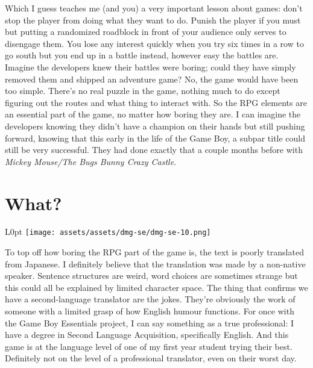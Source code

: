 \documentclass{book}
\let\oldcenter\center
\let\oldendcenter\endcenter
\renewenvironment{center}{\setlength\topsep{0pt}\oldcenter}{\oldendcenter}
\begin{document}
\begin{center}
\vspace{8pt}
\quad\vspace{4pt}
\end{center}

Which I guess teaches me (and you) a very important lesson about games: don’t stop the player from doing what they want to do. Punish the player if you must but putting a randomized roadblock in front of your audience only serves to disengage them. You lose any interest quickly when you try six times in a row to go south but you end up in a battle instead, however easy the battles are. Imagine the developers knew their battles were boring; could they have simply removed them and shipped an adventure game? No, the game would have been too simple. There’s no real puzzle in the game, nothing much to do except figuring out the routes and what thing to interact with. So the RPG elements are an essential part of the game, no matter how boring they are. I can imagine the developers knowing they didn’t have a champion on their hands but still pushing forward, knowing that this early in the life of the Game Boy, a subpar title could still be very successful. They had done exactly that a couple months before with \emph{Mickey Mouse/The Bugs Bunny Crazy Castle}.

\FloatBarrier\needspace{10mm}\section*{What?}\nopagebreak[4]

\begin{wrapfigure}{L}{0pt} \texttt{[image: assets/assets/dmg-se/dmg-se-10.png]}\end{wrapfigure}
To top off how boring the RPG part of the game is, the text is poorly translated from Japanese. I definitely believe that the translation was made by a non-native speaker. Sentence structures are weird, word choices are sometimes strange but this could all be explained by limited character space. The thing that confirms we have a second-language translator are the jokes. They’re obviously the work of someone with a limited grasp of how English humour functions. For once with the Game Boy Essentials project, I can say something as a true professional: I have a degree in Second Language Acquisition, specifically English. And this game is at the language level of one of my first year student trying their best. Definitely not on the level of a professional translator, even on their worst day.
\end{document}
